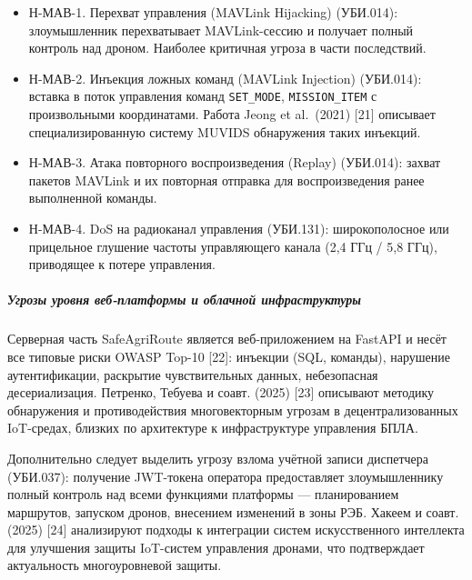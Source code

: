 \documentclass[14pt,a4paper]{extarticle}
\providecommand{\tightlist}{%
  \setlength{\itemsep}{0pt}\setlength{\parskip}{0pt}}
\begin{document}
\begin{itemize}
\tightlist
\item
  Н-МАВ-1. Перехват управления (MAVLink Hijacking) (УБИ.014): злоумышленник перехватывает MAVLink-сессию и получает полный контроль над дроном. Наиболее критичная угроза в части последствий.
\item
  Н-МАВ-2. Инъекция ложных команд (MAVLink Injection) (УБИ.014): вставка в поток управления команд \texttt{SET\_MODE}, \texttt{MISSION\_ITEM} с произвольными координатами. Работа Jeong et al.~(2021) {[}21{]} описывает специализированную систему MUVIDS обнаружения таких инъекций.
\item
  Н-МАВ-3. Атака повторного воспроизведения (Replay) (УБИ.014): захват пакетов MAVLink и их повторная отправка для воспроизведения ранее выполненной команды.
\item
  Н-МАВ-4. DoS на радиоканал управления (УБИ.131): широкополосное или прицельное глушение частоты управляющего канала (2,4 ГГц / 5,8 ГГц), приводящее к потере управления.
\end{itemize}

\hypertarget{ux443ux433ux440ux43eux437ux44b-ux443ux440ux43eux432ux43dux44f-ux432ux435ux431-ux43fux43bux430ux442ux444ux43eux440ux43cux44b-ux438-ux43eux431ux43bux430ux447ux43dux43eux439-ux438ux43dux444ux440ux430ux441ux442ux440ux443ux43aux442ux443ux440ux44b}{%
\subparagraph{Угрозы уровня веб-платформы и облачной инфраструктуры}\label{ux443ux433ux440ux43eux437ux44b-ux443ux440ux43eux432ux43dux44f-ux432ux435ux431-ux43fux43bux430ux442ux444ux43eux440ux43cux44b-ux438-ux43eux431ux43bux430ux447ux43dux43eux439-ux438ux43dux444ux440ux430ux441ux442ux440ux443ux43aux442ux443ux440ux44b}}

Серверная часть SafeAgriRoute является веб-приложением на FastAPI и несёт все типовые риски OWASP Top-10 {[}22{]}: инъекции (SQL, команды), нарушение аутентификации, раскрытие чувствительных данных, небезопасная десериализация. Петренко, Тебуева и соавт. (2025) {[}23{]} описывают методику обнаружения и противодействия многовекторным угрозам в децентрализованных IoT-средах, близких по архитектуре к инфраструктуре управления БПЛА.

Дополнительно следует выделить угрозу взлома учётной записи диспетчера (УБИ.037): получение JWT-токена оператора предоставляет злоумышленнику полный контроль над всеми функциями платформы --- планированием маршрутов, запуском дронов, внесением изменений в зоны РЭБ. Хакеем и соавт. (2025) {[}24{]} анализируют подходы к интеграции систем искусственного интеллекта для улучшения защиты IoT-систем управления дронами, что подтверждает актуальность многоуровневой защиты.
\end{document}
